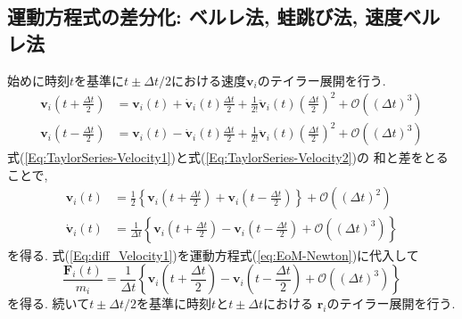 \subsection{運動方程式の差分化: ベルレ法, 蛙跳び法, 速度ベルレ法}
始めに時刻$t$を基準に$t \pm \Delta t/2$における速度$\bm{v}_{i}$のテイラー展開を行う. 
\begin{align}
 \bm{v}_{i} \left(t + \frac{\Delta t}{2} \right)
 &= \bm{v}_{i}(t)
  + \dot{\bm{v}}_{i}(t)\frac{\Delta t}{2}
  + \frac{1}{2!} \ddot{\bm{v}}_{i} (t) \left(\frac{\Delta t}{2} \right)^{2}
  + \mathcal{O}((\Delta t)^3)
    \label{Eq:TaylorSeries-Velocity1} 
 \\
 \bm{v}_{i} \left(t - \frac{\Delta t}{2} \right)
 &= \bm{v}_{i}(t)
  - \dot{\bm{v}}_{i}(t)\frac{\Delta t}{2}
  + \frac{1}{2!} \ddot{\bm{v}}_{i} (t) \left(\frac{\Delta t}{2} \right)^{2}
  + \mathcal{O}((\Delta t)^3)
 \label{Eq:TaylorSeries-Velocity2}
\end{align}
式(\ref{Eq:TaylorSeries-Velocity1})と式(\ref{Eq:TaylorSeries-Velocity2})の
和と差をとることで,
\begin{align}
    \bm{v}_{i}(t) 
 &=
    \frac{1}{2}
    \left\{
            \bm{v}_{i}\left(t + \frac{\Delta t}{2} \right)
          + \bm{v}_{i}\left(t - \frac{\Delta t}{2} \right)
    \right\}
  +
    \mathcal{O}((\Delta t)^{2})
 \label{Eq:Velocity1}
 \\
    \dot{\bm{v}}_{i}(t)
 &=
    \frac{1}{\Delta t}
    \left\{
            \bm{v}_{i} \left( t + \frac{\Delta t}{2} \right)
          - \bm{v}_{i} \left( t - \frac{\Delta t}{2} \right)
          + \mathcal{O}((\Delta t)^3)
    \right\}
 \label{Eq:diff_Velocity1}
\end{align}
を得る. 式(\ref{Eq:diff_Velocity1})を運動方程式(\ref{eq:EoM-Newton})に代入して
\begin{equation}
   \frac{\bm{F}_{i}(t)}{m_{i}}
 =
   \frac{1}{\Delta t}
   \left\{
           \bm{v}_{i} \left( t + \frac{\Delta t}{2} \right)
         - \bm{v}_{i} \left( t - \frac{\Delta t}{2} \right)
         + \mathcal{O}((\Delta t)^3)
   \right\}
 \label{Eq:EoM_DiffFormura1}
\end{equation}
を得る. 続いて$t \pm \Delta t/2$を基準に時刻$t$と$t \pm \Delta t$における
$\bm{r}_{i}$のテイラー展開を行う. 
